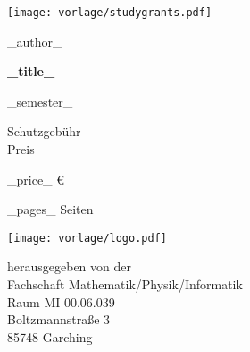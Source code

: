 \documentclass[a4paper]{article}
\begin{document}
\ifstudygrants
    \begin{flushright}
    \texttt{[image: vorlage/studygrants.pdf]}
    \end{flushright}
\fi

\begin{center}\sffamily

\huge _author_

\vfill

\Huge \textbf{_title_}\\

\vfill

\LARGE _semester_

\vfill

\ifstudygrants
\Huge Schutzgebühr \\
\else
\Huge Preis \\
\fi

\Huge _price_ \euro

\vfill
_pages_ Seiten

\vfill
\texttt{[image: vorlage/logo.pdf]}

\vfill
\large
herausgegeben von der \\
Fachschaft Mathematik/Physik/Informatik \\
Raum MI 00.06.039 \\
Boltzmannstraße 3 \\
85748 Garching

\vfill
\,\hfill{}\hfill\,
\vfill
\end{center}
\end{document}
